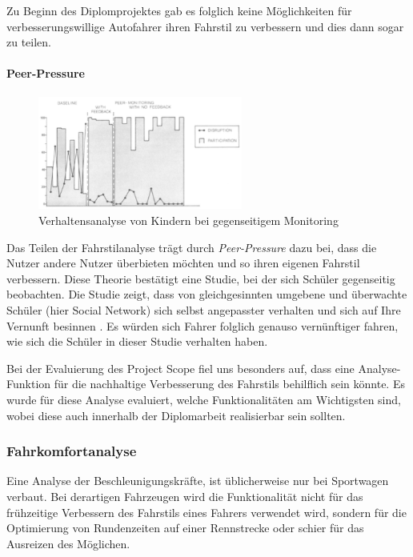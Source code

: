 Zu Beginn des Diplomprojektes gab es folglich keine Möglichkeiten für verbesserungswillige Autofahrer ihren Fahrstil zu verbessern und dies dann sogar zu teilen. 
\newpage
\paragraph{Peer-Pressure} 
\begin{figure}\centering
    \includegraphics[width=0.6\textwidth]{images/peerPressure}
    \caption{Verhaltensanalyse von Kindern bei gegenseitigem Monitoring \cite{SIMR.CH1-fahrstil-analyse.PeerPressure}} \label{Fig:imgPeerPressure}
\end{figure}
Das Teilen der Fahrstilanalyse trägt durch \textit{Peer-Pressure}  dazu bei, dass die Nutzer andere Nutzer überbieten möchten und so ihren eigenen Fahrstil verbessern. Diese Theorie bestätigt eine Studie, bei der sich Schüler gegenseitig beobachten. Die Studie zeigt, dass von gleichgesinnten umgebene und überwachte Schüler (hier Social Network) sich selbst angepasster verhalten und sich auf Ihre Vernunft besinnen \cite{SIMR.CH1-fahrstil-analyse.PeerPressure}. Es würden sich Fahrer folglich genauso vernünftiger fahren, wie sich die Schüler in dieser Studie verhalten haben.

Bei der Evaluierung des Project Scope fiel uns besonders auf, dass eine Analyse-Funktion für die nachhaltige Verbesserung des Fahrstils behilflich sein könnte. Es wurde für diese Analyse evaluiert, welche Funktionalitäten am Wichtigsten sind, wobei diese auch innerhalb der Diplomarbeit realisierbar sein sollten.

\subsubsection{Fahrkomfortanalyse}
Eine Analyse der Beschleunigungskräfte, ist üblicherweise nur bei Sportwagen verbaut. Bei derartigen Fahrzeugen wird die Funktionalität nicht für das frühzeitige Verbessern des Fahrstils eines Fahrers verwendet wird, sondern für die Optimierung von Rundenzeiten auf einer Rennstrecke oder schier für das Ausreizen des Möglichen.

